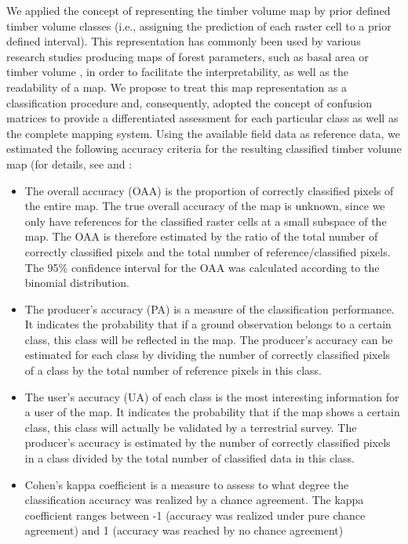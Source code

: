 We applied the concept of representing the timber volume map by prior defined timber volume classes (i.e., assigning the prediction of each raster cell to a prior defined interval). This representation has commonly been used by various research studies producing maps of forest parameters, such as basal area or timber volume \citep{tonolli2011, latifi2010, clementel2012}, in order to facilitate the interpretability, as well as the readability of a map. We propose to treat this map representation as a classification procedure and, consequently, adopted the concept of confusion matrices to provide a differentiated assessment for each particular class as well as the complete mapping system. Using the available field data as reference data, we estimated the following accuracy criteria for the resulting classified timber volume map (for details, see \citet{congalton2008} and \citet{richards1999}:

\begin{itemize}
	\item The overall accuracy (OAA) is the proportion of correctly classified pixels of the entire map. The true overall accuracy of the map is unknown, since we only have references for the classified raster cells at a small subspace of the map. The OAA is therefore estimated by the ratio of the total number of correctly classified pixels and the total number of reference/classified pixels. The 95\% confidence interval for the OAA was calculated according to the binomial distribution.
	\item 	The producer's accuracy (PA) is a measure of the classification performance. It indicates the probability that if a ground observation belongs to a certain class, this class will be reflected in the map. The producer's accuracy can be estimated for each class by dividing the number of correctly classified pixels of a class by the total number of reference pixels in this class.
	\item The user's accuracy (UA) of each class is the most interesting information for a user of the map. It indicates the probability that if the map shows a certain class, this class will actually be validated by a terrestrial survey. The producer's accuracy is estimated by the number of correctly classified pixels in a class divided by the total number of classified data in this class.
	\item Cohen's kappa coefficient is a measure to assess to what degree the classification accuracy was realized by a chance agreement. The kappa coefficient ranges between -1 (accuracy was realized under pure chance agreement) and 1 (accuracy was reached by no chance agreement)
\end{itemize}

